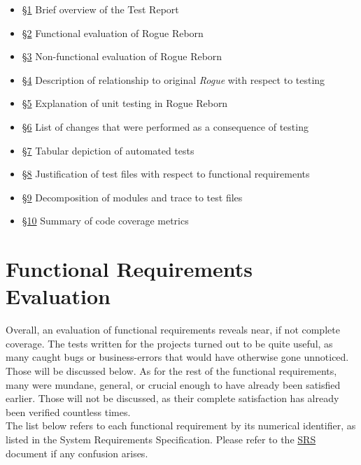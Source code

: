 \documentclass[12pt, titlepage]{article}
\newcommand{\newsection}[1]{
  \newpage
  \section{#1}
}
\begin{document}
	\begin{itemize}
		\item [] \hyperref[Section_Intro]{\S 1} Brief overview of the Test Report
		\item [] \hyperref[Section_FR_Evaluation]{\S 2} Functional evaluation of Rogue Reborn
		\item [] \hyperref[Section_NFR_Evaluation]{\S 3} Non-functional evaluation of Rogue Reborn
		\item [] \hyperref[Section_Comparison]{\S 4} Description of relationship to original \textit{Rogue} with respect to testing 
		\item [] \hyperref[Section_UT]{\S 5} Explanation of unit testing in Rogue Reborn
		\item [] \hyperref[Section_Changes]{\S 6} List of changes that were performed as a consequence of testing
		\item [] \hyperref[Section_Automated]{\S 7} Tabular depiction of automated tests
		\item [] \hyperref[Section_R_Trace]{\S 8} Justification of test files with respect to functional requirements
		\item [] \hyperref[Section_M_Trace]{\S 9} Decomposition of modules and trace to test files
		\item [] \hyperref[Section_Metrics]{\S 10} Summary of code coverage metrics

	\end{itemize}

\newsection{Functional Requirements Evaluation} \label{Section_FR_Evaluation}
	Overall, an evaluation of functional requirements reveals near, if not complete coverage. The tests written for the projects turned out to be quite useful, as many caught bugs or business-errors that would have otherwise gone unnoticed. Those will be discussed below. As for the rest of the functional requirements, many were mundane, general, or crucial enough to have already been satisfied earlier. Those will not be discussed, as their complete satisfaction has already been verified countless times.\\

	The list below refers to each functional requirement by its numerical identifier, as listed in the System Requirements Specification. Please refer to the \href{run:../SRS/SRS.pdf}{SRS} document if any confusion arises.
\end{document}
